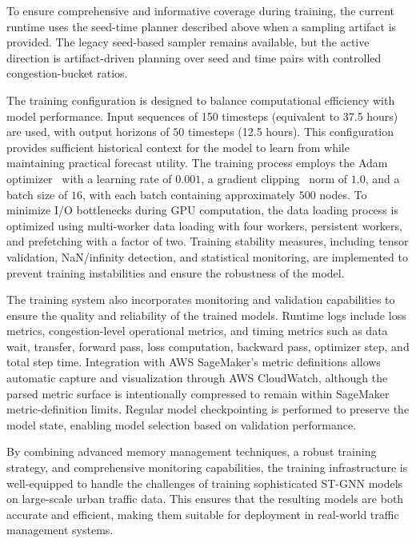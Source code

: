 \documentclass[11pt, a4paper]{article}
\begin{document}
To ensure comprehensive and informative coverage during training, the current runtime uses the seed-time planner described above when a sampling artifact is provided. The legacy seed-based sampler remains available, but the active direction is artifact-driven planning over seed and time pairs with controlled congestion-bucket ratios.

The training configuration is designed to balance computational efficiency with model performance. Input sequences of 150 timesteps (equivalent to 37.5 hours) are used, with output horizons of $50$ timesteps (12.5 hours). This configuration provides sufficient historical context for the model to learn from while maintaining practical forecast utility. The training process employs the Adam optimizer~\cite{kingma2014adam} with a learning rate of $0.001$, a gradient clipping~\cite{pascanu2013difficulty} norm of $1.0$, and a batch size of $16$, with each batch containing approximately $500$ nodes. To minimize I/O bottlenecks during GPU computation, the data loading process is optimized using multi-worker data loading with four workers, persistent workers, and prefetching with a factor of two. Training stability measures, including tensor validation, NaN/infinity detection, and statistical monitoring, are implemented to prevent training instabilities and ensure the robustness of the model.

The training system also incorporates monitoring and validation capabilities to ensure the quality and reliability of the trained models. Runtime logs include loss metrics, congestion-level operational metrics, and timing metrics such as data wait, transfer, forward pass, loss computation, backward pass, optimizer step, and total step time. Integration with AWS SageMaker's metric definitions allows automatic capture and visualization through AWS CloudWatch, although the parsed metric surface is intentionally compressed to remain within SageMaker metric-definition limits. Regular model checkpointing is performed to preserve the model state, enabling model selection based on validation performance.

By combining advanced memory management techniques, a robust training strategy, and comprehensive monitoring capabilities, the training infrastructure is well-equipped to handle the challenges of training sophisticated ST-GNN models on large-scale urban traffic data. This ensures that the resulting models are both accurate and efficient, making them suitable for deployment in real-world traffic management systems.
\end{document}
